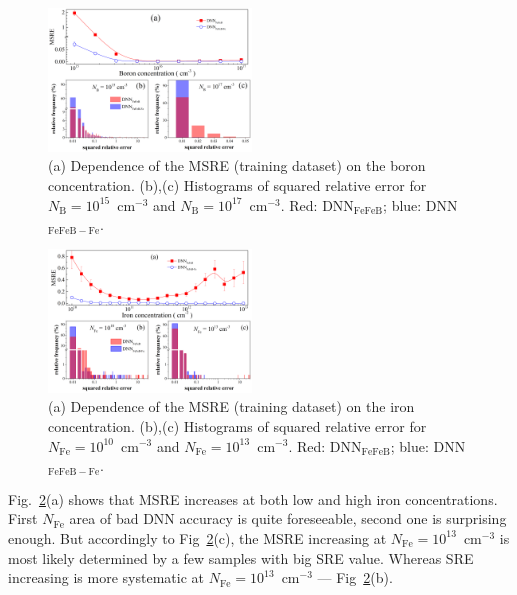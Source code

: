 \documentclass[a4paper,fleqn]{cas-sc}
\begin{document}
\begin{figure}[tb]
\centering
\includegraphics[width=0.48\textwidth]{F6}
\caption{(a) Dependence of the MSRE (training dataset) on the boron concentration.
(b),(c) Histograms of squared  relative error for $N_\mathrm{B}=10^{15}$~cm$^{-3}$ and $N_\mathrm{B}=10^{17}$~cm$^{-3}$.
Red: DNN$_\mathrm{FeFeB}$; blue: DNN$_\mathrm{FeFeB-Fe}$.
}
\label{fig_B}
\end{figure}

\begin{figure}[tb]
\centering
\includegraphics[width=0.48\textwidth]{F7}
\caption{(a) Dependence of the MSRE (training dataset) on the iron concentration.
(b),(c) Histograms of squared  relative error for $N_\mathrm{Fe}=10^{10}$~cm$^{-3}$ and $N_\mathrm{Fe}=10^{13}$~cm$^{-3}$.
Red: DNN$_\mathrm{FeFeB}$; blue: DNN$_\mathrm{FeFeB-Fe}$.}
\label{fig_Fe}
\end{figure}

Fig.~\ref{fig_Fe}(a) shows that MSRE increases at both low and high iron concentrations.
First $N_\mathrm{Fe}$ area of bad DNN accuracy is quite foreseeable,
second one is surprising enough.
But accordingly to Fig~\ref{fig_Fe}(c), the MSRE increasing at $N_\mathrm{Fe}=10^{13}$~cm$^{-3}$ is most likely determined by  a few samples with big SRE value.
Whereas SRE increasing is more systematic at $N_\mathrm{Fe}=10^{13}$~cm$^{-3}$ --- Fig~\ref{fig_Fe}(b).
\end{document}

